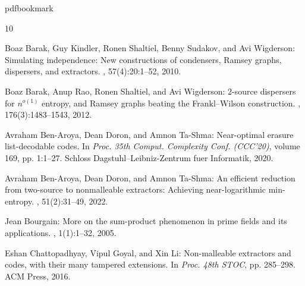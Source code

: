 \newcommand{\prelim}{Preliminary version in\ }\newcommand{\prelims}{Preliminary
  versions in\ }
\providecommand{\bibhead}[1]{}
\expandafter\ifx\csname pdfbookmark\endcsname\relax%
  \providecommand{\tocrefpdfbookmark}{}
\else\providecommand{\tocrefpdfbookmark}{%
   \hypertarget{tocreferences}{}%
   \pdfbookmark[1]{References}{tocreferences}}%
\fi

\tocrefpdfbookmark
\begin{thebibliography}{10}

\bibhead{BKSSW10}
{\sc Boaz Barak, Guy Kindler, Ronen Shaltiel, Benny Sudakov, and Avi
  Wigderson}: Simulating independence: {N}ew constructions of condensers,
  {R}amsey graphs, dispersers, and extractors.
, 57(4):20:1--52, 2010.
\newblock [\epfmtdoi{10.1145/1734213.1734214}]

\bibhead{BRSW12}
{\sc Boaz Barak, Anup Rao, Ronen Shaltiel, and Avi Wigderson}: 2-source
  dispersers for {$n^{o(1)}$} entropy, and {R}amsey graphs beating the
  {F}rankl--{W}ilson construction.
, 176(3):1483--1543, 2012.

\bibhead{BDT20}
{\sc Avraham Ben-Aroya, Dean Doron, and Amnon Ta-Shma}: Near-optimal erasure
  list-decodable codes.
\newblock In {\em Proc. 35th Comput. Complexity Conf. (CCC'20)}, volume 169,
  pp. 1:1--27. Schloss Dagstuhl--Leibniz-Zentrum fuer Informatik, 2020.

\bibhead{BADTS17}
{\sc Avraham Ben-Aroya, Dean Doron, and Amnon Ta-Shma}: An efficient reduction
  from two-source to nonmalleable extractors: Achieving near-logarithmic
  min-entropy.
, 51(2):31--49, 2022.
\newblock [\epfmtdoi{10.1137/17M1133245}]

\bibhead{Bourgain05}
{\sc Jean Bourgain}: More on the sum-product phenomenon in prime fields and its
  applications.
, 1(1):1--32, 2005.
\newblock [\epfmtdoi{10.1142/S1793042105000108}]

\bibhead{CGL16}
{\sc Eshan Chattopadhyay, Vipul Goyal, and Xin Li}: Non-malleable extractors
  and codes, with their many tampered extensions.
\newblock In {\em Proc. 48th STOC}, pp. 285--298. ACM Press, 2016.
\newblock [\epfmtdoi{10.1145/2897518.2897547}]


\end{thebibliography}
